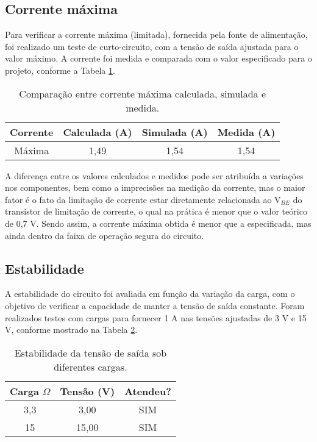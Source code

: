 \subsection{Corrente máxima}

Para verificar a corrente máxima (limitada), fornecida pela fonte de alimentação, foi realizado um teste de curto-circuito, com a tensão de saída ajustada para o valor máximo. A corrente foi medida e comparada com o valor especificado para o projeto, conforme a Tabela \ref{tab:corrente}.

\begin{table}[H]
    \centering
    \caption{Comparação entre corrente máxima calculada, simulada e medida.}
    \label{tab:corrente}
    \begin{tabular}{|c|c|c|c|}
    \hline
    \textbf{Corrente} & \textbf{Calculada (A)} & \textbf{Simulada (A)} & \textbf{Medida (A)} \\ \hline
    Máxima           & 1,49                   & 1,54                 & 1,54               \\ \hline
    \end{tabular}
\end{table}

A diferença entre os valores calculados e medidos pode ser atribuída a variações nos componentes, bem como a imprecisões na medição da corrente, mas o maior fator é o fato da limitação de corrente estar diretamente relacionada ao V\(_{BE}\) do transistor de limitação de corrente, o qual na prática é menor que o valor teórico de 0,7 V. Sendo assim, a corrente máxima obtida é menor que a especificada, mas ainda dentro da faixa de operação segura do circuito.

\subsection{Estabilidade}

A estabilidade do circuito foi avaliada em função da variação da carga, com o objetivo de verificar a capacidade de manter a tensão de saída constante. Foram realizados testes com cargas para fornecer 1 A nas tensões ajustadas de 3 V e 15 V, conforme mostrado na Tabela \ref{tab:estabilidade}.

\begin{table}[H] 
    \centering 
    \caption{Estabilidade da tensão de saída sob diferentes cargas.} 
    \label{tab:estabilidade} 
    \begin{tabular}{|c|c|c|} 
        \hline 
        \textbf{Carga \(\Omega\)} & \textbf{Tensão (V)} & \textbf{Atendeu?} \\ \hline 
        3,3 & 3,00 & SIM \\ \hline 
        15 & 15,00 & SIM \\ \hline 
    \end{tabular} 
\end{table}

